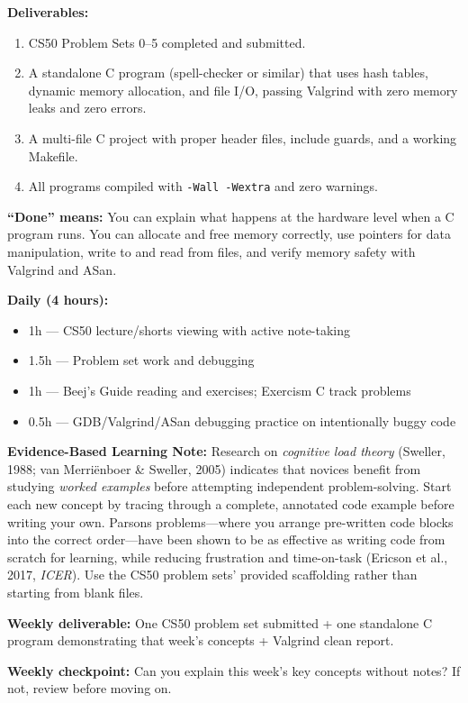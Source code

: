 \documentclass[11pt, a4paper, oneside]{report}
\begin{document}
\begin{milestonebox}
\textbf{Deliverables:}
\begin{enumerate}[leftmargin=*]
\item CS50 Problem Sets 0--5 completed and submitted.
\item A standalone C program (spell-checker or similar) that uses hash tables, dynamic memory allocation, and file I/O, passing Valgrind with zero memory leaks and zero errors.
\item A multi-file C project with proper header files, include guards, and a working Makefile.
\item All programs compiled with \texttt{-Wall -Wextra} and zero warnings.
\end{enumerate}

\textbf{``Done'' means:} You can explain what happens at the hardware level when a C program runs. You can allocate and free memory correctly, use pointers for data manipulation, write to and read from files, and verify memory safety with Valgrind and ASan.
\end{milestonebox}

\begin{practicebox}
\textbf{Daily (4 hours):}
\begin{itemize}[leftmargin=*]
\item 1h --- CS50 lecture/shorts viewing with active note-taking
\item 1.5h --- Problem set work and debugging
\item 1h --- Beej's Guide reading and exercises; Exercism C track problems
\item 0.5h --- GDB/Valgrind/ASan debugging practice on intentionally buggy code
\end{itemize}


\textbf{Evidence-Based Learning Note:} Research on \emph{cognitive load theory} (Sweller, 1988; van Merri\"enboer \& Sweller, 2005) indicates that novices benefit from studying \emph{worked examples} before attempting independent problem-solving. Start each new concept by tracing through a complete, annotated code example before writing your own. Parsons problems---where you arrange pre-written code blocks into the correct order---have been shown to be as effective as writing code from scratch for learning, while reducing frustration and time-on-task (Ericson et al., 2017, \emph{ICER}). Use the CS50 problem sets' provided scaffolding rather than starting from blank files.


\textbf{Weekly deliverable:} One CS50 problem set submitted + one standalone C program demonstrating that week's concepts + Valgrind clean report.


\textbf{Weekly checkpoint:} Can you explain this week's key concepts without notes? If not, review before moving on.
\end{practicebox}
\end{document}
